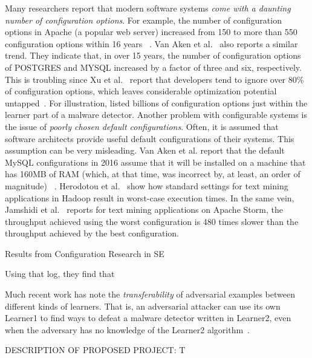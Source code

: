  
Many researchers report that modern software systems {\em come with a daunting number of configuration options}. For example, the number of configuration options in Apache (a popular web server) increased from 150 to more than 550 configuration options within 16 years ~\cite{xu2015hey}. Van Aken et al.~\cite{van2017automatic} also reports a similar trend. They indicate that, in over 15 years, the number of configuration options of POSTGRES and MYSQL increased by a factor of three and six, respectively. This is troubling since Xu et al.~\cite{xu2015hey} report that developers tend to ignore over 80\% of configuration options, which leaves considerable optimization potential untapped~\cite{xu2015hey}. For illustration,  listed billions of configuration options just within the learner part of a malware detector. Another problem with configurable systems is the issue of 
{\em poorly chosen default configurations}. Often, it is assumed that software architects provide useful default configurations of their systems. This assumption can be very misleading. Van Aken et al. report that the default MySQL configurations in 2016 assume that it will be installed on a machine that has 160MB of RAM (which, at that time, was incorrect by, at least, an order of magnitude) ~\cite{van2017automatic}. Herodotou et al.~\cite{herodotou2011starfish} show how standard settings for text mining applications in Hadoop result in worst-case execution times. In the same vein, Jamshidi et al.~\cite{jamshidi2016uncertainty} reports for text mining applications on Apache Storm, the throughput achieved using the worst configuration is 480 times slower than the throughput achieved by the best configuration.
 
 
 
 
 Results from Configuration Research in SE
 
 Using that log, they find that 


Much recent work has note the {\em transferability} of adversarial examples between different kinds of learners. That is,
an adversarial  attacker can use its own  Learner1 to find ways to defeat a malware detector written in Learner2, even when the adversary has no knowledge of the Learner2 algorithm~\cite{papernot2016transferability}. 


 
 




DESCRIPTION OF PROPOSED PROJECT:  T
   



